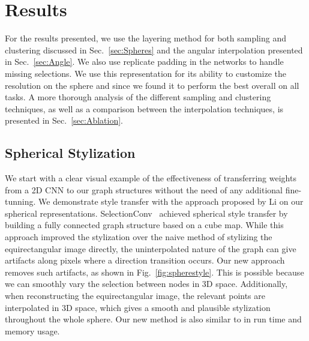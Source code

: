 \documentclass[10pt,twocolumn,letterpaper]{article}
\begin{document}
\section{Results} \label{sec:Results}
For the results presented, we use the layering method for both sampling and clustering discussed in Sec.~\ref{sec:Spheres} and the angular interpolation  presented in Sec.~\ref{sec:Angle}. 
We also use replicate padding in the networks to handle missing selections. 
We use this representation for its ability to customize the resolution on the sphere and since we found it to perform the best overall on all tasks. 
A more thorough analysis of the different sampling and clustering techniques, as well as a comparison between the interpolation techniques, is presented in Sec.~\ref{sec:Ablation}.





\subsection{Spherical Stylization}

We start with a clear visual example of the effectiveness of transferring weights from a 2D CNN to our graph structures without the need of any additional fine-tunning. We demonstrate style transfer with the approach proposed by Li \etal \cite{Li2019} on our spherical representations. 
SelectionConv~\cite{SelectionConv} achieved spherical style transfer by building a fully connected graph structure based on a cube map. While this approach improved the stylization over the naive method
of stylizing the equirectangular image directly, 
the uninterpolated nature of the graph can give artifacts
along pixels where a direction transition occurs. 
Our 
new
approach removes such artifacts, as shown in Fig.~\ref{fig:spherestyle}. This is possible because 
we 
can smoothly vary the selection between nodes in 3D space. 
Additionally, when reconstructing the equirectangular image, the relevant points are interpolated in 3D space, which gives a smooth and plausible stylization throughout the whole sphere.
Our new method is also similar to \cite{SelectionConv} in run time and memory usage.
\end{document}
